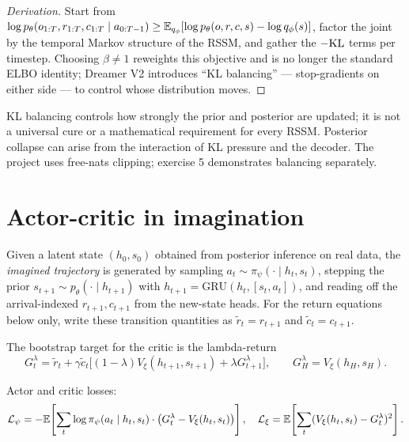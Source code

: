 \documentclass[11pt,oneside]{scrbook}
\begin{document}
\begin{proof}[Derivation]
Start from $\log p_\theta(o_{1:T}, r_{1:T}, c_{1:T}\mid a_{0:T-1}) \geq \mathbb{E}_{q_\phi}[\log p_\theta(o, r, c, s) - \log q_\phi(s)]$, factor the joint by the temporal Markov structure of the RSSM, and gather the $-\mathrm{KL}$ terms per timestep. Choosing $\beta\ne1$ reweights this objective and is no longer the standard ELBO identity; Dreamer V2 introduces ``KL balancing'' --- stop-gradients on either side --- to control whose distribution moves.
\end{proof}

\begin{pitfall}
KL balancing controls how strongly the prior and posterior are updated; it is not a universal cure or a mathematical requirement for every RSSM. Posterior collapse can arise from the interaction of KL pressure and the decoder. The project uses free-nats clipping; exercise 5 demonstrates balancing separately.
\end{pitfall}

\section{Actor-critic in imagination}

\begin{definition}
Given a latent state $(h_0, s_0)$ obtained from posterior inference on real data, the
\emph{imagined trajectory} is generated by sampling $a_t \sim \pi_\psi(\cdot \mid h_t, s_t)$,
stepping the prior $s_{t+1} \sim p_\theta(\cdot \mid h_{t+1})$ with
$h_{t+1} = \mathrm{GRU}(h_t, [s_t, a_t])$, and reading off the arrival-indexed $r_{t+1},c_{t+1}$ from the new-state heads. For the return equations below only, write these transition quantities as $\tilde r_t=r_{t+1}$ and $\tilde c_t=c_{t+1}$.
\end{definition}

\begin{theorem}
The bootstrap target for the critic is the lambda-return
\[
  G_t^\lambda = \tilde r_t + \gamma \tilde c_t \bigl[(1 - \lambda) V_\xi(h_{t+1}, s_{t+1}) + \lambda G_{t+1}^\lambda\bigr],
  \qquad G_H^\lambda = V_\xi(h_H, s_H).
\]
\end{theorem}

Actor and critic losses:
\[
  \mathcal{L}_\psi = -\mathbb{E}\!\left[\sum_t \log \pi_\psi(a_t \mid h_t, s_t) \cdot \bigl(G_t^\lambda - V_\xi(h_t, s_t)\bigr)\right],\quad
  \mathcal{L}_\xi = \mathbb{E}\!\left[\sum_t (V_\xi(h_t, s_t) - G_t^\lambda)^2\right].
\]
\end{document}
